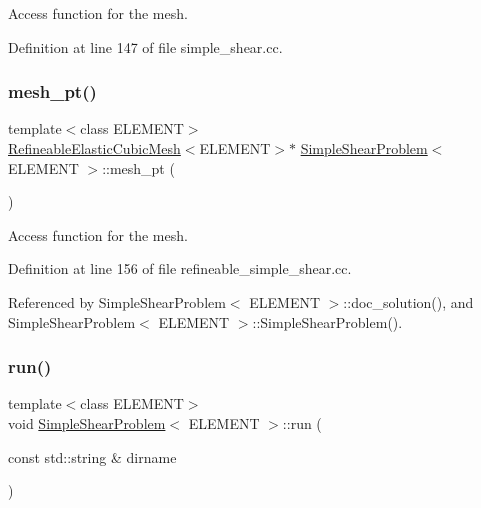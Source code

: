 Access function for the mesh. 



Definition at line 147 of file simple\+\_\+shear.\+cc.

\mbox{\label{classSimpleShearProblem_a2f13119c6c66305a6bde6945434a8f10}} 
\subsubsection{\texorpdfstring{mesh\+\_\+pt()}{mesh\_pt()}\hspace{0.1cm}{\footnotesize\ttfamily [2/2]}}
{\footnotesize\ttfamily template$<$class E\+L\+E\+M\+E\+NT$>$ \\
\hyperlink{classRefineableElasticCubicMesh}{Refineable\+Elastic\+Cubic\+Mesh}$<$E\+L\+E\+M\+E\+NT$>$$\ast$ \hyperlink{classSimpleShearProblem}{Simple\+Shear\+Problem}$<$ E\+L\+E\+M\+E\+NT $>$\+::mesh\+\_\+pt (\begin{DoxyParamCaption}{ }\end{DoxyParamCaption})\hspace{0.3cm}{\ttfamily [inline]}}



Access function for the mesh. 



Definition at line 156 of file refineable\+\_\+simple\+\_\+shear.\+cc.



Referenced by Simple\+Shear\+Problem$<$ E\+L\+E\+M\+E\+N\+T $>$\+::doc\+\_\+solution(), and Simple\+Shear\+Problem$<$ E\+L\+E\+M\+E\+N\+T $>$\+::\+Simple\+Shear\+Problem().

\mbox{\label{classSimpleShearProblem_ac1746a2634e310571d40d70719d509c0}} 
\subsubsection{\texorpdfstring{run()}{run()}\hspace{0.1cm}{\footnotesize\ttfamily [1/2]}}
{\footnotesize\ttfamily template$<$class E\+L\+E\+M\+E\+NT$>$ \\
void \hyperlink{classSimpleShearProblem}{Simple\+Shear\+Problem}$<$ E\+L\+E\+M\+E\+NT $>$\+::run (\begin{DoxyParamCaption}\item[{const std\+::string \&}]{dirname }\end{DoxyParamCaption})}



